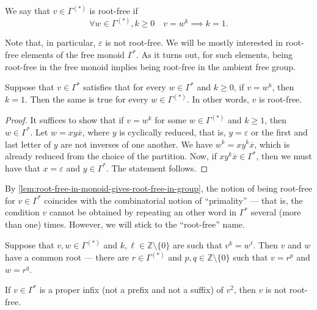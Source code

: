 \begin{definition}
    We say that $v \in \Gamma^{(*)}$ is root-free if
    \[
        \forall w \in \Gamma^{(*)}, k \geq 0 \quad v = w^k \implies k = 1.
    \]
\end{definition}

Note that, in particular, $\varepsilon$ is not root-free. We will be mostly interested in root-free elements of the free monoid $\Gamma^*$. As it turns out, for such elements, being root-free in the free monoid implies being root-free in the ambient free group.

\begin{lemma}\label{lem:root-free-in-monoid-gives-root-free-in-group}
    Suppose that $v \in \Gamma^*$ satisfies that for every $w \in \Gamma^*$ and $k \geq 0$, if $v = w^k$, then $k = 1$. Then the same is true for every $w \in \Gamma^{(*)}$. In other words, $v$ is root-free.
\end{lemma}

\begin{proof}
    It suffices to show that if $v = w^k$ for some $w \in \Gamma^{(*)}$ and $k \geq 1$, then $w \in \Gamma^*$. Let $w = x y \overline{x}$, where $y$ is cyclically reduced, that is, $y = \varepsilon$ or the first and last letter of $y$ are not inverses of one another. We have $w^k = x y^k \overline{x}$, which is already reduced from the choice of the partition. Now, if $x y^k \overline{x} \in \Gamma^*$, then we must have that $x = \varepsilon$ and $y \in \Gamma^*$. The statement follows.
\end{proof}

By \cref{lem:root-free-in-monoid-gives-root-free-in-group}, the notion of being root-free for $v \in \Gamma^*$ coincides with the combinatorial notion of ``primality'' --- that is, the condition $v$ cannot be obtained by repeating an other word in $\Gamma^*$ several (more than one) times. However, we will stick to the ``root-free'' name.

\begin{lemma}\label{lem:common-root-theorem}
    Suppose that $v,w \in \Gamma^{(*)}$ and $k, \ell \in \mathbb{Z} \setminus \{0 \}$ are such that $v^k = w^\ell$. Then $v$ and $w$ have a common root --- there are $r \in \Gamma^{(*)}$ and $p,q \in \mathbb{Z} \setminus \{0 \}$ such that $v = r^p$ and $w = r^q$.
\end{lemma}

\begin{lemma}\label{lem:prime-words-must-perfectly-align}
    If $v \in \Gamma^*$ is a proper infix (not a prefix and not a suffix) of $v^2$, then $v$ is not root-free.
\end{lemma}


